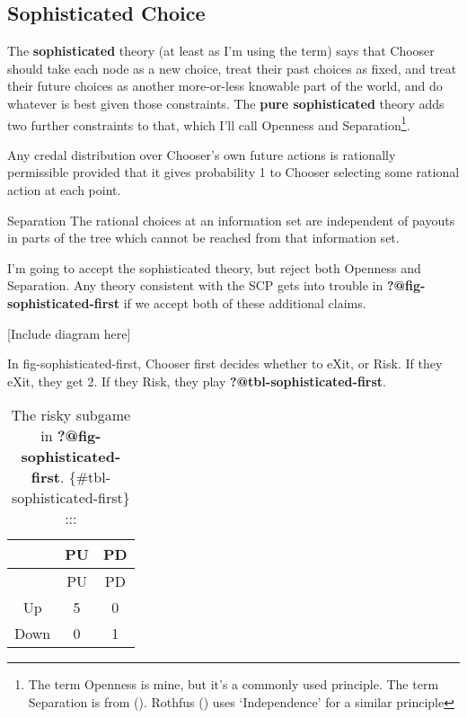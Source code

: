 \documentclass[
  11pt,
  letterpaper,
  DIV=11,
  numbers=noendperiod,
  twoside]{scrartcl}
\providecommand{\tightlist}{%
  \setlength{\itemsep}{0pt}\setlength{\parskip}{0pt}}\usepackage{longtable,booktabs,array}
\begin{document}
\subsection{Sophisticated Choice}\label{sec-sophisticated}

The \textbf{sophisticated} theory (at least as I'm using the term) says
that Chooser should take each node as a new choice, treat their past
choices as fixed, and treat their future choices as another more-or-less
knowable part of the world, and do whatever is best given those
constraints. The \textbf{pure sophisticated} theory adds two further
constraints to that, which I'll call Openness and Separation\footnote{The
  term Openness is mine, but it's a commonly used principle. The term
  Separation is from ().
  Rothfus () uses `Independence'
  for a similar principle}.

\begin{description}
\tightlist
\item[Openness]
Any credal distribution over Chooser's own future actions is rationally
permissible provided that it gives probability 1 to Chooser selecting
some rational action at each point.
\end{description}

Separation The rational choices at an information set are independent of
payouts in parts of the tree which cannot be reached from that
information set.

I'm going to accept the sophisticated theory, but reject both Openness
and Separation. Any theory consistent with the SCP gets into trouble in
\textbf{?@fig-sophisticated-first} if we accept both of these additional
claims.

{[}Include diagram here{]}

In fig-sophisticated-first, Chooser first decides whether to eXit, or
Risk. If they eXit, they get 2. If they Risk, they play
\textbf{?@tbl-sophisticated-first}.

\begin{longtable}[]{@{}ccc@{}}
\caption{The risky subgame in \textbf{?@fig-sophisticated-first}.
\{\#tbl-sophisticated-first\} :::}\tabularnewline
\toprule\noalign{}
& PU & PD \\
\midrule\noalign{}
\endfirsthead
\toprule\noalign{}
& PU & PD \\
\midrule\noalign{}
\endhead
\bottomrule\noalign{}
\endlastfoot
Up & 5 & 0 \\
Down & 0 & 1 \\
\end{longtable}
\end{document}
